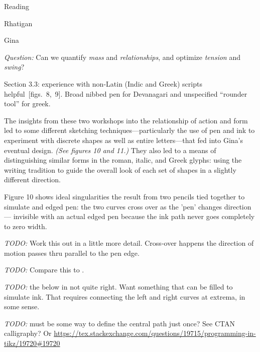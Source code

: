 \documentclass[11pt]{PalisadesLakesBook}
\begin{document}
\begin{plSection}{Reading}
\begin{plSection}{Rhatigan}
\begin{plSection}{Gina}
\begin{plSection}{}
\emph{Question:}
Can we quantify \emph{mass} and \emph{relationships},
and optimize \emph{tension} and \emph{swing}?

Section 3.3: experience with non-Latin (Indic and Greek) 
scripts helpful~[figs.~8,~9]. Broad nibbed pen for Devanagari
and unspecified ``rounder tool'' for greek.

\begin{plQuote}{}{}
The insights from these two workshops into the relationship
of action and form led to some different sketching
techniques---particularly the use of pen and ink 
to experiment with discrete shapes as well as entire 
letters---that fed into Gina's eventual design.
\textit{(See figures 10 and 11.)}
They also led to a means of distinguishing similar forms
in the roman, italic, and Greek glyphs:
using the writing tradition to guide the overall look
of each set of shapes in a slightly different direction.
\end{plQuote}

Figure 10 shows ideal singularities the result from two pencils
tied together to simulate and edged pen: the two curves cross over
as the 'pen' changes direction --- invisible 
with an actual edged pen because the ink path never goes 
completely to zero width.

\emph{TODO:} Work this out in a little more detail. 
Cross-over happens the direction of motion passes thru parallel 
to the pen edge.

\emph{TODO:} 
Compare this to .

\emph{TODO:} the below in not quite right.
Want something that can be filled to simulate ink.
That requires connecting the left and right curves
at extrema, in some sense.

\emph{TODO:} must be some way to define the central path just once? 
See CTAN calligraphy?
Or \url{https://tex.stackexchange.com/questions/19715/programming-in-tikz/19720#19720}



\end{plSection}
\end{plSection}
\end{plSection}
\end{plSection}
\end{document}
